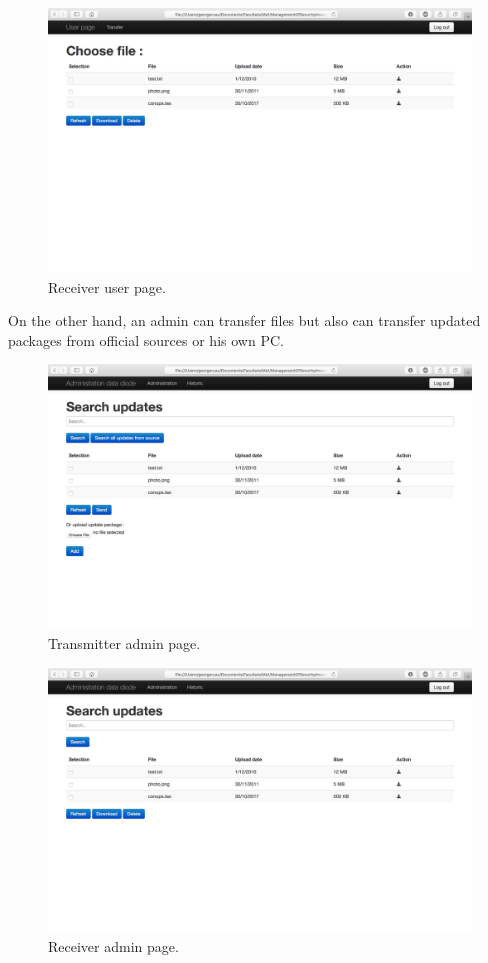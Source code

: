 \documentclass[a4paper,10pt]{article}
\begin{document}
\begin{figure}[!h]
\centering
\includegraphics[scale=0.35]{images/userreceiver.png}
\caption{Receiver user page.}
\label{fig:receiveruserpage}
\end{figure}

On the other hand, an admin can transfer files but also can transfer updated packages from official sources or his own PC. 

\begin{figure}[!h]
\centering
\includegraphics[scale=0.35]{images/admintransmitter.png}
\caption{Transmitter admin page.}
\label{fig:transadminpage}
\end{figure}

\begin{figure}[!h]
\centering
\includegraphics[scale=0.35]{images/adminreceiver.png}
\caption{Receiver admin page.}
\label{fig:receiveradminpage}
\end{figure}
\clearpage
\end{document}
